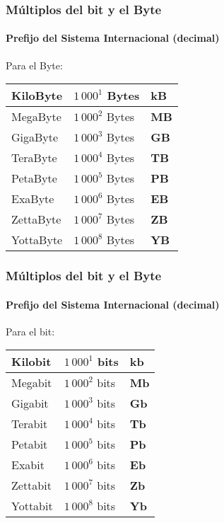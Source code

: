 \documentclass[11pt,a4paper,spanish]{beamer}
\begin{document}
\begin{frame}

\frametitle{Múltiplos del bit y el Byte}

    \framesubtitle{Prefijo del Sistema Internacional (decimal)}

Para el Byte:

\centering
\begin{tabular}{l l l}
    KiloByte & $1\,000^{1}$ Bytes & \textbf{kB}\\ \hline
    MegaByte & $1\,000^{2}$ Bytes & \textbf{MB}\\ \hline
    GigaByte & $1\,000^{3}$ Bytes & \textbf{GB}\\ \hline
    TeraByte & $1\,000^{4}$ Bytes & \textbf{TB}\\ \hline
    PetaByte & $1\,000^{5}$ Bytes & \textbf{PB}\\ \hline
    ExaByte & $1\,000^{6}$ Bytes & \textbf{EB}\\ \hline
    ZettaByte & $1\,000^{7}$ Bytes & \textbf{ZB}\\ \hline
    YottaByte & $1\,000^{8}$ Bytes & \textbf{YB}\\
\end{tabular}

\end{frame}

\begin{frame}

\frametitle{Múltiplos del bit y el Byte}

    \framesubtitle{Prefijo del Sistema Internacional (decimal)}

Para el bit:

\centering
\begin{tabular}{l l l}
    Kilobit & $1\,000^{1}$ bits & \textbf{kb}\\ \hline
    Megabit & $1\,000^{2}$ bits & \textbf{Mb}\\ \hline
    Gigabit & $1\,000^{3}$ bits & \textbf{Gb}\\ \hline
    Terabit & $1\,000^{4}$ bits & \textbf{Tb}\\ \hline
    Petabit & $1\,000^{5}$ bits & \textbf{Pb}\\ \hline
    Exabit & $1\,000^{6}$ bits & \textbf{Eb}\\ \hline
    Zettabit & $1\,000^{7}$ bits & \textbf{Zb}\\ \hline
    Yottabit & $1\,000^{8}$ bits & \textbf{Yb}\\
\end{tabular}
\end{frame}
\end{document}
